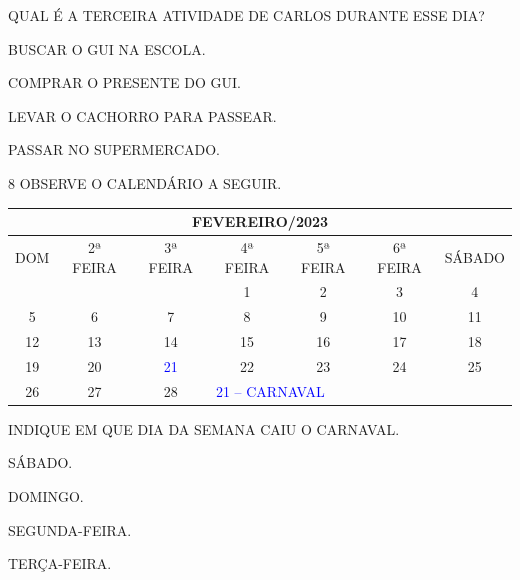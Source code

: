 QUAL É A TERCEIRA ATIVIDADE DE CARLOS DURANTE ESSE DIA?

\begin{escolha}[itemsep=0pt]
\item BUSCAR O GUI NA ESCOLA.

\item COMPRAR O PRESENTE DO GUI.

\item LEVAR O CACHORRO PARA PASSEAR.

\item PASSAR NO SUPERMERCADO.
\end{escolha}

\num{8} OBSERVE O CALENDÁRIO A SEGUIR.\bigskip

\begin{table}[H]\footnotesize
\centering
\begin{tabular}{|ccccccc|}
\hline
\multicolumn{7}{|c|}{FEVEREIRO/2023} \\ \hline
\multicolumn{1}{|c|}{DOM} & \multicolumn{1}{c|}{2ª FEIRA} & \multicolumn{1}{c|}{3ª FEIRA} & \multicolumn{1}{c|}{4ª FEIRA} & \multicolumn{1}{c|}{5ª FEIRA} & \multicolumn{1}{c|}{6ª FEIRA} & SÁBADO \\ \hline
\multicolumn{1}{|c|}{} & \multicolumn{1}{c|}{} & \multicolumn{1}{c|}{} & \multicolumn{1}{c|}{1} & \multicolumn{1}{c|}{2} & \multicolumn{1}{c|}{3} & 4 \\ \hline
\multicolumn{1}{|c|}{5} & \multicolumn{1}{c|}{6} & \multicolumn{1}{c|}{7} & \multicolumn{1}{c|}{8} & \multicolumn{1}{c|}{9} & \multicolumn{1}{c|}{10} & 11 \\ \hline
\multicolumn{1}{|c|}{12} & \multicolumn{1}{c|}{13} & \multicolumn{1}{c|}{14} & \multicolumn{1}{c|}{15} & \multicolumn{1}{c|}{16} & \multicolumn{1}{c|}{17} & 18 \\ \hline
\multicolumn{1}{|c|}{19} & \multicolumn{1}{c|}{20} & \multicolumn{1}{c|}{\textcolor{blue}{21}} & \multicolumn{1}{c|}{22} & \multicolumn{1}{c|}{23} & \multicolumn{1}{c|}{24} & 25 \\ \hline
\multicolumn{1}{|c|}{26} & \multicolumn{1}{c|}{27} & \multicolumn{1}{c|}{28} & \multicolumn{4}{l|}{\textcolor{blue}{21 -- CARNAVAL}} \\ \hline
\end{tabular}\bigskip
\end{table}

INDIQUE EM QUE DIA DA SEMANA CAIU O CARNAVAL.

\begin{escolha}
\item SÁBADO.

\item DOMINGO.

\item SEGUNDA-FEIRA.

\item TERÇA-FEIRA.
\end{escolha}

